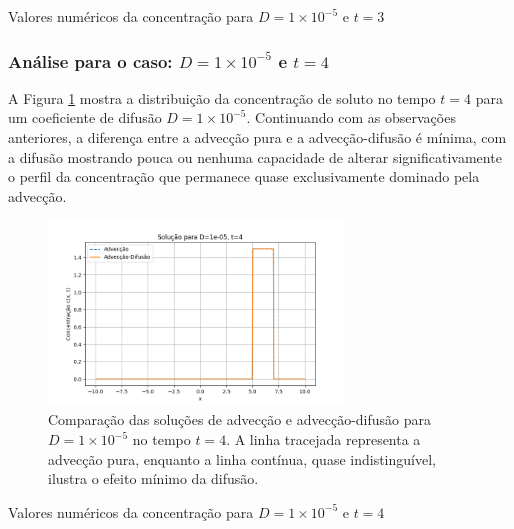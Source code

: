 \begin{table}[H]
    \centering
    \caption{Valores numéricos da concentração para \( D = 1 \times 10^{-5} \) e \( t = 3 \)}
    
\end{table}


\subsubsection{Análise para o caso: \( D = 1 \times 10^{-5} \) e \( t = 4 \)}

A Figura \ref{fig:advec_diffus_1e-05_t4} mostra a distribuição da concentração de soluto no tempo \( t = 4 \) para um coeficiente de difusão \( D = 1 \times 10^{-5} \). Continuando com as observações anteriores, a diferença entre a advecção pura e a advecção-difusão é mínima, com a difusão mostrando pouca ou nenhuma capacidade de alterar significativamente o perfil da concentração que permanece quase exclusivamente dominado pela advecção.

\begin{figure}[H]
    \centering
    \includegraphics[width=0.7\textwidth]{code/plot/Advec_Difus_t4_D1e-05.png}
    \caption{Comparação das soluções de advecção e advecção-difusão para \( D = 1 \times 10^{-5} \) no tempo \( t = 4 \). A linha tracejada representa a advecção pura, enquanto a linha contínua, quase indistinguível, ilustra o efeito mínimo da difusão.}
    \label{fig:advec_diffus_1e-05_t4}
\end{figure}

\begin{table}[H]
    \centering
    \caption{Valores numéricos da concentração para \( D = 1 \times 10^{-5} \) e \( t = 4 \)}
    
\end{table}



